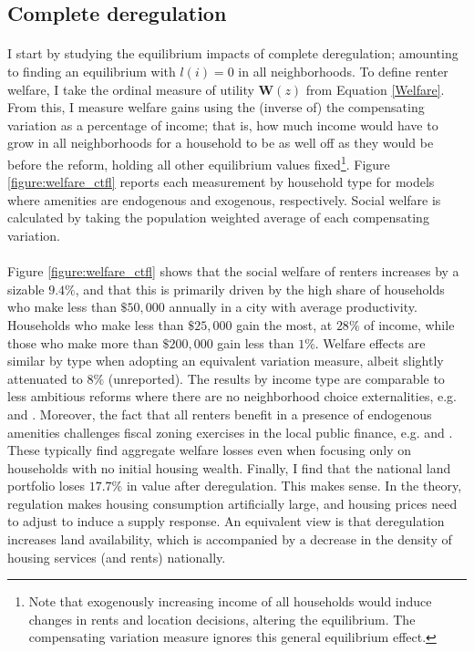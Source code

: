 \documentclass[12pt]{article}
\begin{document}
\subsection{Complete deregulation}
\paragraph*{}
I start by studying the equilibrium impacts of complete deregulation; amounting to finding an equilibrium with $l(i) = 0$ in all neighborhoods. To define renter welfare, I take the ordinal measure of utility $\boldsymbol{W}(z)$ from Equation \eqref{Welfare}. From this, I measure welfare gains using the (inverse of) the compensating variation as a percentage of income; that is, how much income would have to grow in all neighborhoods for a household to be as well off as they would be before the reform, holding all other equilibrium values fixed\footnote{Note that exogenously increasing income of all households would induce changes in rents and location decisions, altering the equilibrium. The compensating variation measure ignores this general equilibrium effect.}. Figure \ref{figure:welfare_ctfl} reports each measurement by household type for models where amenities are endogenous and exogenous, respectively. Social welfare is calculated by taking the population weighted average of each compensating variation.

\paragraph*{} Figure \ref{figure:welfare_ctfl} shows that the social welfare of renters increases by a sizable $9.4\%$, and that this is primarily driven by the high share of households who make less than $\$50,000$ annually in a city with average productivity. Households who make less than $\$25,000$ gain the most, at $28\%$ of income, while those who make more than $\$200,000$ gain less than $1\%$. Welfare effects are similar by type when adopting an equivalent variation measure, albeit slightly attenuated to $8 \%$ (unreported). The results by income type are comparable to less ambitious reforms where there are no neighborhood choice externalities, e.g. \cite{Song} and \cite{kulka}. Moreover, the fact that all renters benefit in a presence of endogenous amenities challenges fiscal zoning exercises in the local public finance, e.g. \cite{calabresetal} and \cite{ineffTiebout}. These typically find aggregate welfare losses even when focusing only on households with no initial housing wealth. Finally, I find that the national land portfolio loses $17.7\%$ in value after deregulation. This makes sense. In the theory, regulation makes housing consumption artificially large, and housing prices need to adjust to induce a supply response. An equivalent view is that deregulation increases land availability, which is accompanied by a decrease in the density of housing services (and rents) nationally.
\end{document}
